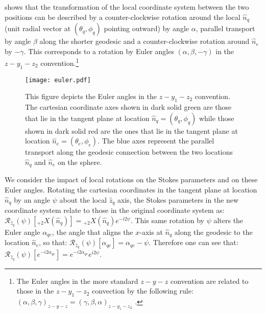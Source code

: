  shows that the transformation of the local coordinate system between the two positions can be described by a counter-clockwise rotation around the local $\hat n_q$ (unit radial vector at $(\theta_q,\phi_q)$ pointing outward) by angle $\alpha$, parallel transport by angle $\beta$ along the shorter geodesic and a counter-clockwise rotation around $\hat n_e$ by $-\gamma$.  This corresponds to a rotation by Euler angles $(\alpha,\beta,-\gamma)$ in the $z-y_1-z_2$ convention.\footnote{The Euler angles in the more standard $z-y-z$ convention are related to those in the $z-y_1-z_2$ convection by the following rule: $(\alpha,\beta,\gamma)_{z-y-z} =(\gamma,\beta,\alpha)_{z-y_1-z_2}$ \cite{varshalovich}.}
%
\begin{figure}%
\centering
\texttt{[image: euler.pdf]}
\caption{This figure depicts the Euler angles in the $z-y_1-z_2$ convention. The cartesian coordinate axes shown in dark solid green are those that lie in the tangent plane at location $\hat{n}_q = (\theta_q, \phi_q)$ while those shown in dark solid red are the ones that lie in the tangent plane at location $\hat{n}_e = (\theta_e, \phi_e)$. The blue axes represent the parallel transport along the geodesic connection between the two locations $\hat{n}_q$ and $\hat{n}_e$ on the sphere.}
\label{fig:euler_angles}
\end{figure}
%

We consider the impact of local rotations on the Stokes parameters and on these Euler angles. Rotating the cartesian coordinates in the tangent plane at location $\hat{n}_q$ by an angle $\psi$ about the local $\hat{z}_q$ axis, the Stokes parameters in the new coordinate system relate to those in the original coordinate system as:
$\mathcal{R}_{\hat{z}_q}(\psi)[{}_{+2}X(\hat{n}_q)] =  {}_{+2}X(\hat{n}_q) e^{-i2\psi} $.
This same rotation by $\psi$ alters the Euler angle $\alpha_{qe}$, the angle that aligns the $x$-axis at $\hat{n}_q$ along the geodesic to the location $\hat{n}_e$, so that: $\mathcal{R}_{\hat{z}_q}(\psi)[\alpha_{qe}] = \alpha_{qe} - \psi$.  Therefore one can see that: $\mathcal{R}_{\hat{z}_q}(\psi)[e^{-i2\alpha_{qe}}] =  e^{-i2\alpha_{qe}} e^{i2\psi}$.

